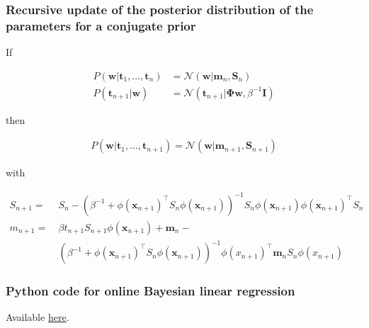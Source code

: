 \begin{frame}
    \frametitle{Recursive update of the posterior distribution of the
    parameters for a conjugate prior}

    \scriptsize
    \begin{claim}
        If

        \begin{align}
            P(\mathbf{w}|\mathbf{t}_1,\ldots,\mathbf{t}_n)&=\mathcal{N}(\mathbf{w}|\mathbf{m}_n,\mathbf{S}_n)\label{eq:conjPriorPrior}\\
            P(\mathbf{t}_{n+1}|\mathbf{w})&=\mathcal{N}(\mathbf{t}_{n+1}|\boldsymbol{\Phi}\mathbf{w},\beta^{-1}\mathbf{I})\label{eq:conjPriorLike}
        \end{align}

        then

        \begin{align*}
            P(\mathbf{w}|\mathbf{t}_1,\ldots,\mathbf{t}_{n+1})=\mathcal{N}(\mathbf{w}|\mathbf{m}_{n+1},\mathbf{S}_{n+1})
        \end{align*}

        with

        \begin{align}
            S_{n+1}=\ &S_n-(\beta^{-1}+\phi(\mathbf{x}_{n+1})^\intercal S_n\phi(\mathbf{x}_{n+1}))^{-1}S_n\phi(\mathbf{x}_{n+1})\phi(\mathbf{x}_{n+1})^\intercal
            S_n\label{eq:Sn+1}\\
            m_{n+1}=\ &\beta t_{n+1}S_{n+1}\phi(\mathbf{x}_{n+1})+\mathbf{m}_n-\nonumber\\
                      &(\beta^{-1}+\phi(\mathbf{x}_{n+1})^\intercal
                      S_n\phi(\mathbf{x}_{n+1}))^{-1}\phi(x_{n+1})^\intercal\mathbf{m}_nS_n\phi(x_{n+1})\label{eq:mn+1}
        \end{align}
        \label{claim:conjPriorForBayesianLinearRegression}
    \end{claim}
    \normalsize
\end{frame}

\begin{frame}
    \frametitle{Python code for online Bayesian linear regression}

    Available
    \href{https://joacorapela.github.io/gcnuBridging2023/auto\_examples/bayesianLinearRegression/plotOnlineBayesianLinearRegression.html\#sphx-glr-auto-examples-bayesianlinearregression-plotonlinebayesianlinearregression-py}{here}.

\end{frame}

